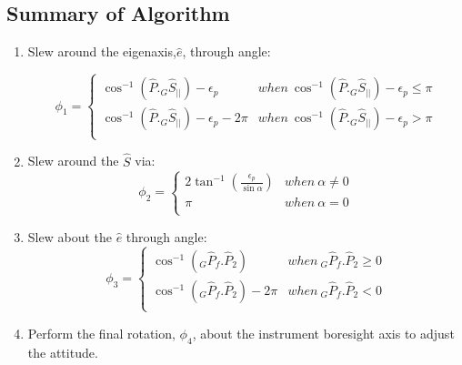 \documentclass[letterpaper, preprint, paper,11pt]{AAS}	%
\begin{document}
	
	\subsection{Summary of Algorithm} 
		
		\begin{enumerate}
			\item Slew around the eigenaxis,$\hat{e}$, through angle:
			
			\begin{equation}\label{phi1}
				\phi_1=\left\{
				\begin{array}{ll}
				\cos^{-1}(\hat{P}._G\hat{S}_{||})-\epsilon_p& when\  \cos^{-1}(\hat{P}._G\hat{S}_{||})-\epsilon_p\leq \pi\\
				\cos^{-1}(\hat{P}._G\hat{S}_{||})-\epsilon_p-2\pi& when\ \cos^{-1}(\hat{P}._G\hat{S}_{||})-\epsilon_p>\pi\\
				\end{array}
				\right.
			\end{equation}
			\item Slew around the $\hat{S}$ via:
			\begin{equation}\label{phi2}
				\phi_2=\left\{
				\begin{array}{ll}
				2\tan^{-1}(\frac{\epsilon_p}{\sin\alpha})& when\  \alpha\neq 0\\
				\pi& when\ \alpha=0\\
				\end{array}
				\right.
			\end{equation}
			\item Slew about the $\hat{e}$ through angle:
			\begin{equation}\label{phi3}
				\phi_3=\left\{
				\begin{array}{ll}
				\cos^{-1}(_G\hat{P}_f.\hat{P}_2)& when\  _G\hat{P}_f.\hat{P}_2\geq 0\\
				\cos^{-1}(_G\hat{P}_f.\hat{P}_2)-2\pi& when\ _G\hat{P}_f.\hat{P}_2<0\\
				\end{array}
				\right.
			\end{equation}
			
			\item Perform the final rotation, $\phi_4$, about the instrument boresight axis to adjust the attitude. 
		\end{enumerate}
	
\end{document}
